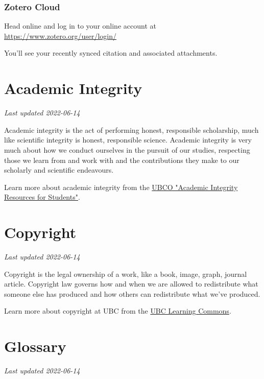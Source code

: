 \documentclass[
]{book}
\begin{document}
\hypertarget{zotero-cloud}{%
\subsection*{Zotero Cloud}\label{zotero-cloud}}

Head online and log in to your online account at \url{https://www.zotero.org/user/login/}

You'll see your recently synced citation and associated attachments.

\hypertarget{academic-integrity}{%
\chapter{Academic Integrity}\label{academic-integrity}}

\emph{Last updated 2022-06-14}

Academic integrity is the act of performing honest, responsible scholarship, much like scientific integrity is honest, responsible science. Academic integrity is very much about how we conduct ourselves in the pursuit of our studies, respecting those we learn from and work with and the contributions they make to our scholarly and scientific endeavours.

Learn more about academic integrity from the \href{https://students.ok.ubc.ca/academic-success/learning-hub/online-resources/academic-integrity/}{UBCO "Academic Integrity Resources for Students"}.

\hypertarget{copyright-1}{%
\chapter{Copyright}\label{copyright-1}}

\emph{Last updated 2022-06-14}

Copyright is the legal ownership of a work, like a book, image, graph, journal article. Copyright law governs how and when we are allowed to redistribute what someone else has produced and how others can redistribute what we've produced.

Learn more about copyright at UBC from the \href{https://copyright.ubc.ca/}{UBC Learning Commons}.

\hypertarget{glossary}{%
\chapter{Glossary}\label{glossary}}

\emph{Last updated 2022-06-14}
\end{document}
